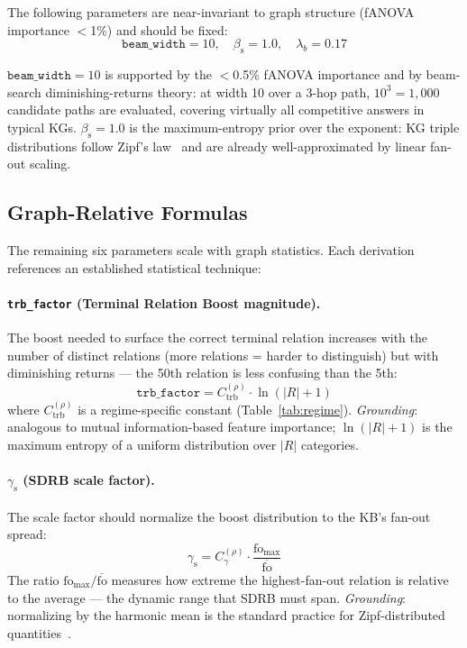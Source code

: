 \documentclass[10pt,twocolumn]{article}
\newcommand{\gS}{\gamma_{\mathrm{s}}}   %
\newcommand{\bS}{\beta_{\mathrm{s}}}    %
\newcommand{\SDRB}{\textsc{SDRB}}
\newcommand{\fanova}{f\textsc{ANOVA}}
\begin{document}
\begin{proposition}
\label{prop:universal}
The following parameters are near-invariant to graph structure
(\fanova{} importance $<$1\%) and should be fixed:
\[
  \texttt{beam\_width} = 10, \quad \bS = 1.0, \quad \lambda_b = 0.17
\]
\end{proposition}

$\texttt{beam\_width} = 10$ is supported by the $<$0.5\% fANOVA importance
and by beam-search diminishing-returns theory: at width 10 over a 3-hop path,
$10^3 = 1{,}000$ candidate paths are evaluated, covering virtually all
competitive answers in typical KGs. $\bS = 1.0$ is the maximum-entropy prior
over the exponent: KG triple distributions follow Zipf's law~\cite{mahdisoltani2013}
and are already well-approximated by linear fan-out scaling.

\subsection{Graph-Relative Formulas}

The remaining six parameters scale with graph statistics. Each derivation
references an established statistical technique:

\paragraph{\texttt{trb\_factor} (Terminal Relation Boost magnitude).}
The boost needed to surface the correct terminal relation increases with the
number of distinct relations (more relations = harder to distinguish) but with
diminishing returns --- the 50th relation is less confusing than the 5th:
\begin{equation}
  \texttt{trb\_factor} = C_{\mathrm{trb}}^{(\rho)} \cdot \ln(|R| + 1)
  \label{eq:trb}
\end{equation}
where $C_{\mathrm{trb}}^{(\rho)}$ is a regime-specific constant (Table~\ref{tab:regime}).
\emph{Grounding}: analogous to mutual information-based feature importance;
$\ln(|R| + 1)$ is the maximum entropy of a uniform distribution over $|R|$ categories.

\paragraph{$\gS$ (SDRB scale factor).}
The scale factor should normalize the boost distribution to the KB's fan-out spread:
\begin{equation}
  \gS = C_\gamma^{(\rho)} \cdot \frac{\mathrm{fo}_{\max}}{\overline{\mathrm{fo}}}
  \label{eq:gamma}
\end{equation}
The ratio $\mathrm{fo}_{\max} / \overline{\mathrm{fo}}$ measures how extreme the
highest-fan-out relation is relative to the average --- the dynamic range that
\SDRB{} must span. \emph{Grounding}: normalizing by the harmonic mean is the
standard practice for Zipf-distributed quantities~\cite{zipf1949}.
\end{document}
